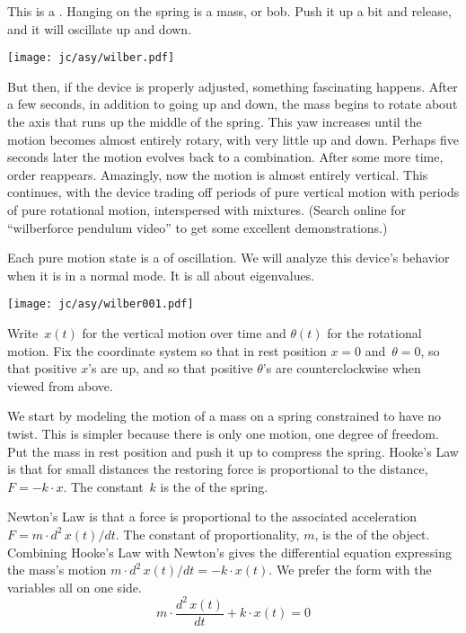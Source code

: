 
% 

This is a .
Hanging on the spring is a mass, or bob.
Push it up a bit and release, and it will oscillate up and down.
\begin{center}
  \texttt{[image: jc/asy/wilber.pdf]}
\end{center}
But then, if the device is properly adjusted, something fascinating happens.
After a few seconds, in addition to going up
and down, the mass begins to rotate
about the axis that runs up the middle of the spring.
This yaw increases until the motion  
becomes almost entirely rotary, with very little up and down.
Perhaps five seconds later the motion evolves back to a combination.
After some more time, order reappears.
Amazingly, now
the motion is almost entirely vertical.
This continues, with the device trading off
periods of pure vertical motion with periods of pure rotational motion,
interspersed with mixtures. 
(Search online for ``wilberforce pendulum video'' to get 
some excellent demonstrations.) 

Each pure motion state is a  of oscillation.
We will analyze this device's behavior when it is in a normal mode. 
It is all about eigenvalues.

\begin{center}
  \texttt{[image: jc/asy/wilber001.pdf]}
\end{center}

Write~$x(t)$ for the vertical motion over time and 
$\theta(t)$ for the rotational motion.
Fix the coordinate system so that in rest position $x=0$ and~$\theta=0$, 
so that positive $x$'s are up, and so that positive $\theta$'s
are counterclockwise when viewed from above.

We start by modeling the motion of a mass on a 
spring constrained to have no twist.
This is simpler because there is only one motion, one degree of freedom.
Put the mass in rest position and 
push it up to compress the spring.
Hooke's Law is that for small distances
the restoring force is 
proportional to the distance, $F=-k\cdot x$.
The constant~$k$ is the
 of the spring.

Newton's Law is that a force is proportional to the 
associated acceleration $F=m\cdot d^2\,x(t)/dt$.
The constant of proportionality, $m$, is the 
of the object.
Combining Hooke's Law with Newton's 
gives the differential equation expressing the 
mass's motion $m\cdot d^2\,x(t)/dt=-k\cdot x(t)$.
We prefer the form with the variables all on one side.
\begin{equation*}
  m\cdot \frac{d^2\,x(t)}{dt}+k\cdot x(t)=0
  \tag{$*$}
\end{equation*}


